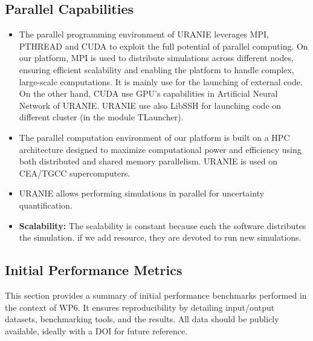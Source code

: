 \subsection{Parallel Capabilities}
\label{sec:WP6:Uranie:performances}


\begin{itemize}
    \item The parallel programming environment of URANIE leverages MPI, PTHREAD
    and CUDA to exploit the full potential of parallel computing. 
    On our platform, MPI is used to distribute simulations across different nodes,
    ensuring efficient scalability and enabling the platform to handle complex, large-scale computations. It is mainly use for the launching of external code.
    On the other hand, CUDA use GPU's capabilities in Artificial Neural Network of URANIE.
    URANIE use also LibSSH for launching code on different cluster (in the module TLauncher).

    \item The parallel computation environment of our platform is built on a HPC architecture designed to maximize computational power and efficiency
    using both distributed and shared memory parallelism. URANIE is used on CEA/TGCC supercomputers.

    \item URANIE allows performing simulations in parallel for uncertainty quantification.
    \item \textbf{Scalability:} The scalability is constant because each the software distributes the simulation. if we add resource, they are devoted to run new simulations.
\end{itemize}


\subsection{Initial Performance Metrics}
\label{sec:WP6:Uranie:metrics}

This section provides a summary of initial performance benchmarks performed in the context of WP6. It ensures reproducibility by detailing input/output datasets, benchmarking tools, and the results. All data should be publicly available, ideally with a DOI for future reference.

